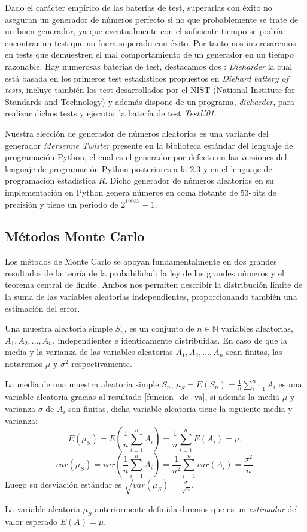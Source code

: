 \documentclass[../proyecto.tex]{memoir}
\begin{document}
Dado el carácter empírico de las baterías de test, superarlas con éxito no aseguran un generador de números perfecto si no que probablemente se trate de un buen generador, ya que eventualmente con el suficiente tiempo se podría encontrar un test que no fuera superado con éxito. Por tanto nos interesaremos en tests que demuestren el mal comportamiento de un generador en un tiempo razonable. Hay numerosas baterías de test, destacamos dos \cite{dieharder,testu01}: \textit{Dieharder} la cual está basada en los primeros test estadísticos propuestos en \textit{Diehard battery of tests}, incluye también los test desarrollados por el NIST (National Institute for Standards and Technology) y además dispone de un programa, \textit{dieharder}, para realizar dichos tests y ejecutar la batería de test \textit{TestU01}.

Nuestra elección de generador de números aleatorios es una variante del generador \textit{Mersenne Twister} \cite{mt} presente en la biblioteca estándar del lenguaje de programación Python, el cual es el generador por defecto en las versiones del lenguaje de programación Python posteriores a la $2.3$ \cite{pyver} y en el lenguaje de programación estadística $R$\cite{langR}. Dicho generador de números aleatorios en su implementación en Python genera números en coma flotante de 53-bits de precisión y tiene un periodo de $2^{19937}-1$. 

\subsection{Métodos Monte Carlo}

Los métodos de Monte Carlo se apoyan fundamentalmente en dos grandes resultados de la teoría de la probabilidad: la ley de los grandes números y el teorema central de límite. Ambos nos permiten describir la distribución límite de la suma de las variables aleatorias independientes, proporcionando también una estimación del error. 

\begin{defi}
Una muestra aleatoria simple $S_n$, es un conjunto de $n\in\mathds{N}$ variables aleatorias, $A_1,A_2,...,A_n$, independientes e idénticamente distribuidas. En caso de que la media y la varianza de las variables aleatorias $A_1,A_2,...,A_n$ sean finitas, las notaremos $\mu$ y $\sigma^2$ respectivamente.
\end{defi}

La media de una muestra aleatoria simple $S_n$, $\mu_S = E(S_n) = \frac{1}{n}\sum_{i=1}^n A_i$ es una variable aleatoria gracias al resultado \ref{funcion_de_va}, si además la media $\mu$ y varianza $\sigma$ de $A_i$ son finitas, dicha variable aleatoria tiene la siguiente media y varianza:$$
E(\mu_S) = E(\frac{1}{n}\sum_{i=1}^n A_i) = \frac{1}{n}\sum_{i=1}^n E(A_i) = \mu,
$$
$$
var(\mu_S) = var(\frac{1}{n}\sum_{i=1}^n A_i) = \frac{1}{n^2} \sum_{i=1}^n var(A_i) = \frac{\sigma^2}{n}.
$$
Luego su desviación estándar es $\sqrt{var(\mu_S)} = \frac{\sigma}{\sqrt{n}}$.
\begin{defi}
La variable aleatoria $\mu_S$ anteriormente definida diremos que es un \textit{estimador} del valor esperado $E(A)=\mu$.
\end{defi}
\end{document}
